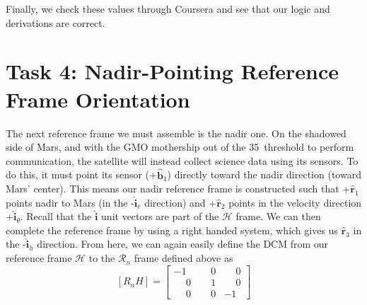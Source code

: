 \documentclass[conf]{new-aiaa}
\begin{document}
Finally, we check these values through Coursera and see that our logic and derivations are correct.















\section{Task 4: Nadir-Pointing Reference Frame Orientation}
The next reference frame we must assemble is the nadir one. On the shadowed side of Mars, and with the GMO mothership out of the 35\textdegree\  threshold to perform communication, the satellite will instead collect science data using its sensors. To do this, it must point its sensor (+$\hat{\bm{b}}_1$) directly toward the nadir direction (toward Mars' center). This means our nadir reference frame is constructed such that +$\hat{\bm{r}}_1$ points nadir to Mars (in the -$\hat{\bm{i}}_r$ direction) and +$\hat{\bm{r}}_2$ points in the velocity direction +$\hat{\bm{i}}_\theta$. Recall that the $\hat{\bm{i}}$ unit vectors are part of the $\mathcal{H}$ frame. We can then complete the reference frame by using a right handed system, which gives us $\hat{\bm{r}}_3$ in the -$\hat{\bm{i}}_h$ direction. From here, we can again easily define the DCM from our reference frame $\mathcal{H}$ to the $\mathcal{R}_n$ frame defined above as 
 \[[R_nH] = \begin{bmatrix}
-1 & \phantom{-}0 & \phantom{-}0 \\
\phantom{-}0 & \phantom{-}1 & \phantom{-}0 \\
\phantom{-}0 & \phantom{-}0 & -1
\end{bmatrix}\]
\end{document}
